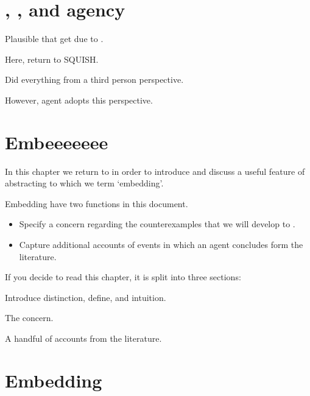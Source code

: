 \section{, , and agency}
\label{sec:ninf2-requ1-agency}

\begin{note}
  Plausible that get \ninf{} due to \requ{}.

  Here, return to SQUISH.

  Did everything from a third person perspective.

  However, agent adopts this perspective.
\end{note}

\section{Embeeeeeee}
\label{sec:embeeeeeee}

\begin{note}
  In this chapter we return to  in order to introduce and discuss a useful feature of abstracting to  which we term `embedding'.

  Embedding have two functions in this document.
  \begin{itemize}
  \item
    Specify a concern regarding the counterexamples that we will develop to \issueConstraint{}.
  \item
    Capture additional accounts of events in which an agent concludes form the literature.
  \end{itemize}
\end{note}

\begin{note}
  If you decide to read this chapter, it is split into three sections:

  \begin{TOCEnum}
  \item

    Introduce distinction, define, and intuition.
  \item

    The concern.
  \item

    A handful of accounts from the literature.
  \end{TOCEnum}
\end{note}

\section{Embedding }
\label{cha:var:ros:Emb}

